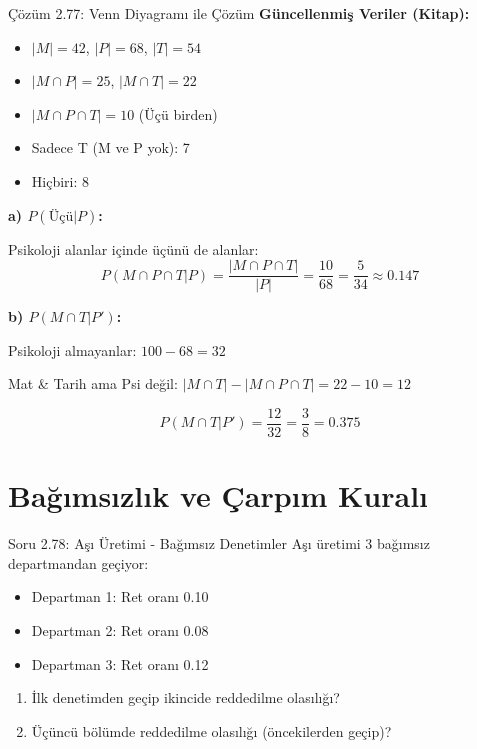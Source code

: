 \documentclass[light]{lutbeamer}
\begin{document}
\begin{frame}{Çözüm 2.77: Venn Diyagramı ile Çözüm}
    \color{blue}
    \textbf{Güncellenmiş Veriler (Kitap):}
    \begin{itemize}
        \item $|M| = 42$, $|P| = 68$, $|T| = 54$
        \item $|M \cap P| = 25$, $|M \cap T| = 22$
        \item $|M \cap P \cap T| = 10$ (Üçü birden)
        \item Sadece T (M ve P yok): 7
        \item Hiçbiri: 8
    \end{itemize}
    
    \vspace{0.3cm}
    \textbf{a) $P(\text{Üçü} | P)$:}
    
    Psikoloji alanlar içinde üçünü de alanlar:
    \[ P(M \cap P \cap T | P) = \frac{|M \cap P \cap T|}{|P|} = \frac{10}{68} = \frac{5}{34} \approx 0.147 \]
    
    \vspace{0.3cm}
    \textbf{b) $P(M \cap T | P')$:}
    
    Psikoloji almayanlar: $100 - 68 = 32$
    
    Mat \& Tarih ama Psi değil: $|M \cap T| - |M \cap P \cap T| = 22 - 10 = 12$
    
    \[ P(M \cap T | P') = \frac{12}{32} = \frac{3}{8} = 0.375 \]
    
    \begin{center}
    \end{center}
\end{frame}

\section{Bağımsızlık ve Çarpım Kuralı}

\begin{frame}{Soru 2.78: Aşı Üretimi - Bağımsız Denetimler}
    Aşı üretimi 3 bağımsız departmandan geçiyor:
    \begin{itemize}
        \item Departman 1: Ret oranı 0.10
        \item Departman 2: Ret oranı 0.08
        \item Departman 3: Ret oranı 0.12
    \end{itemize}
    
    \begin{enumerate}
        \item İlk denetimden geçip ikincide reddedilme olasılığı?
        \item Üçüncü bölümde reddedilme olasılığı (öncekilerden geçip)?
    \end{enumerate}
\end{frame}
\end{document}
